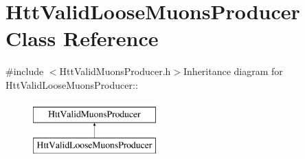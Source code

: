 \hypertarget{classHttValidLooseMuonsProducer}{
\section{HttValidLooseMuonsProducer Class Reference}
\label{classHttValidLooseMuonsProducer}
}


{\ttfamily \#include $<$HttValidMuonsProducer.h$>$}Inheritance diagram for HttValidLooseMuonsProducer::\begin{figure}[H]
\begin{center}
\leavevmode
\includegraphics[height=2cm]{classHttValidLooseMuonsProducer}
\end{center}
\end{figure}
